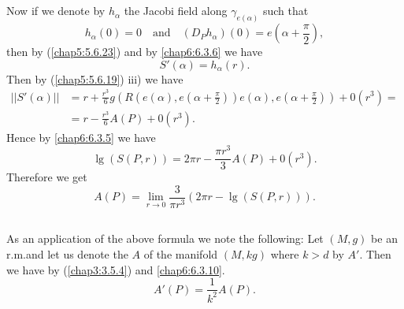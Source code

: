 \setcounter{subsection}{6}
\subsection{}\label{chap6:6.3.7}\pageoriginale
Now if we denote by $h_{\alpha}$ the Jacobi field along
$\gamma_{e(\alpha)}$ such that
$$
h_{\alpha}(0)=0\quad\text{and}\quad
(D_{P}h_{\alpha})(0)=e\left(\alpha+\frac{\pi}{2}\right), 
$$
then by (\ref{chap5:5.6.23}) and by \eqref{chap6:6.3.6} we have
$$
S'(\alpha)=h_{\alpha}(r).
$$
Then by (\ref{chap5:5.6.19}) iii) we have
\begin{align*}
||S'(\alpha)|| &=
r+\frac{r^{3}}{6}g(R(e(\alpha),e(\alpha+\frac{\pi}{2}))e(\alpha),e(\alpha+\frac{\pi}{2}))+0(r^{3})=\tag{6.3.8}\label{chap6:6.3.8}\\
&= r-\frac{r^{3}}{6}A(P)+0(r^{3}).
\end{align*}
Hence by \eqref{chap6:6.3.5} we have
\begin{equation*}
\lg(S(P,r))=2\pi r-\frac{\pi r^{3}}{3}A(P)+0(r^{3}).\tag{6.3.9}\label{chap6:6.3.9}
\end{equation*}
Therefore we get
\begin{equation*}
A(P)=\lim\limits_{r\to 0}\frac{3}{\pi r^{3}}(2\pi
r-\lg(S(P,r))).\tag{6.3.10}\label{chap6:6.3.10} 
\end{equation*}

\setcounter{subsection}{10}

\subsection{}\label{chap6:appli6.3.11}

\begin{application*}
As an application of the above formula we note the following: Let
$(M,g)$ be an r.m.\@ and let us denote the $A$ of the manifold
$(M,kg)$ where $k>d$ by $A'$. Then we have by (\ref{chap3:3.5.4}) and
\eqref{chap6:6.3.10}.
\begin{equation*}
A'(P)=\frac{1}{k^{2}}A(P).\tag{6.3.12}\label{chap6:6.3.12}
\end{equation*}
\end{application*}

\subsection{}\label{chap6:6.3.13}

